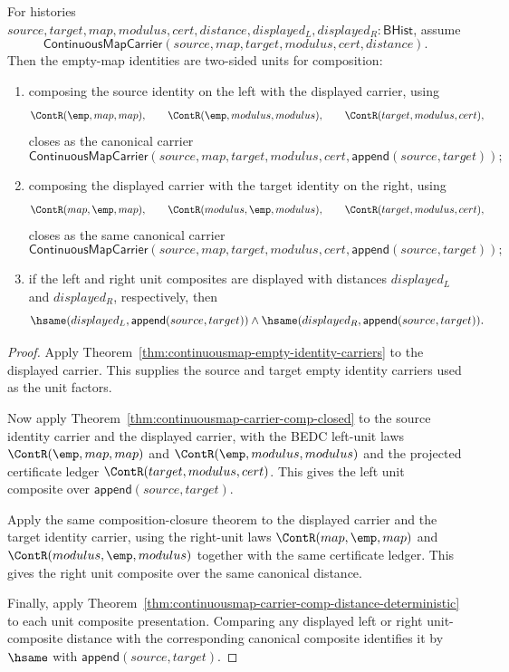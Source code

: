 \begin{theorem}
\label{thm:continuousmap-empty-identities-two-sided-composition-units}
For histories
$source,target,map,modulus,cert,distance,displayed_L,displayed_R:\mathsf{BHist}$,
assume
$$
\mathsf{ContinuousMapCarrier}(source,map,target,modulus,cert,distance).
$$
Then the empty-map identities are two-sided units for composition:
\begin{enumerate}

\item composing the source identity on the left with the displayed carrier,
using
$$
\ContR(\emp,map,map),\qquad
\ContR(\emp,modulus,modulus),\qquad
\ContR(target,modulus,cert),
$$
closes as the canonical carrier
$$
\mathsf{ContinuousMapCarrier}
(source,map,target,modulus,cert,\mathsf{append}(source,target));
$$

\item composing the displayed carrier with the target identity on the right,
using
$$
\ContR(map,\emp,map),\qquad
\ContR(modulus,\emp,modulus),\qquad
\ContR(target,modulus,cert),
$$
closes as the same canonical carrier
$$
\mathsf{ContinuousMapCarrier}
(source,map,target,modulus,cert,\mathsf{append}(source,target));
$$

\item if the left and right unit composites are displayed with distances
$displayed_L$ and $displayed_R$, respectively, then
$$
\hsame(displayed_L,\mathsf{append}(source,target))\land
\hsame(displayed_R,\mathsf{append}(source,target)).
$$
\end{enumerate}
\end{theorem}
\begin{proof}
Apply Theorem~\ref{thm:continuousmap-empty-identity-carriers} to the displayed
carrier. This supplies the source and target empty identity carriers used as the
unit factors.

Now apply Theorem~\ref{thm:continuousmap-carrier-comp-closed} to the source
identity carrier and the displayed carrier, with the BEDC left-unit laws
$\ContR(\emp,map,map)$ and $\ContR(\emp,modulus,modulus)$ and the projected
certificate ledger $\ContR(target,modulus,cert)$. This gives the left unit
composite over $\mathsf{append}(source,target)$.

Apply the same composition-closure theorem to the displayed carrier and the
target identity carrier, using the right-unit laws $\ContR(map,\emp,map)$ and
$\ContR(modulus,\emp,modulus)$ together with the same certificate ledger. This
gives the right unit composite over the same canonical distance.

Finally, apply
Theorem~\ref{thm:continuousmap-carrier-comp-distance-deterministic} to each unit
composite presentation. Comparing any displayed left or right unit-composite
distance with the corresponding canonical composite identifies it by $\hsame$
with $\mathsf{append}(source,target)$.
\end{proof}

